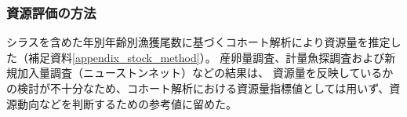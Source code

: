 \subsubsection{資源評価の方法}
シラスを含めた年別年齢別漁獲尾数に基づくコホート解析により資源量を推定した（補足資料\ref{appendix_stock_method}）。
産卵量調査、計量魚探調査および新規加入量調査（ニューストンネット）などの結果は、
資源量を反映しているかの検討が不十分なため、コホート解析における資源量指標値としては用いず、資源動向などを判断するための参考値に留めた。

